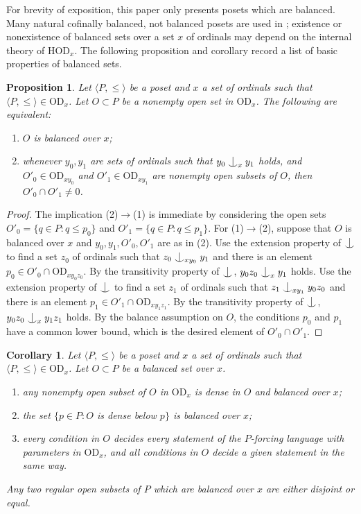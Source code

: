 \documentclass{article}
\newcommand{\hvd}{\mathrm{HOD}}
\newcommand{\vd}{\mathrm{OD}}
\newcommand{\forkindep}[1][]{%
  \mathrel{
    \mathop{
      \vcenter{
        \hbox{\oalign{\noalign{\kern-.3ex}\hfil$\vert$\hfil\cr
              \noalign{\kern-.7ex}
              $\smile$\cr\noalign{\kern-.3ex}}}
      }
    }\displaylimits_{#1}
  }
}
\newtheorem{corollary}[theorem]{Corollary}
\newtheorem{proposition}[theorem]{Proposition}
\theoremstyle{definition}
\begin{document}
\noindent For brevity of exposition, this paper only presents posets which are balanced. Many natural cofinally balanced, not balanced posets are used in \cite{z:geometric}; existence or nonexistence of balanced sets over a set $x$ of ordinals may depend on the internal theory of $\hvd_x$. The following proposition and corollary record a list of basic properties of balanced sets.

\begin{proposition}
\label{extensionproposition1}
Let $\langle P, \leq\rangle$ be a poset and $x$ a set of ordinals such that $\langle P, \leq\rangle\in\vd_x$. Let $O\subset P$ be a nonempty open set in $\vd_x$. The following are equivalent:

\begin{enumerate}
\item $O$ is balanced over $x$;
\item whenever $y_0, y_1$ are sets of ordinals such that $y_0\forkindep[x]y_1$ holds, and $O'_0\in\vd_{xy_0}$ and $O'_1\in\vd_{xy_1}$ are nonempty open subsets of $O$, then $O'_0\cap O'_1\neq 0$.
\end{enumerate}
\end{proposition}

\begin{proof}
The implication (2)$\to$(1) is immediate by considering the open sets $O'_0=\{q\in P\colon q\leq p_0\}$ and $O'_1=\{q\in P\colon q\leq p_1\}$. For (1)$\to$(2), suppose that $O$ is balanced over $x$ and $y_0, y_1, O'_0, O'_1$ are as in (2). Use the extension property of $\forkindep$ to find a set $z_0$ of ordinals such that $z_0\forkindep[xy_0]y_1$ and there is an element $p_0\in O'_0\cap \vd_{xy_0z_0}$. By the transitivity property of $\forkindep$, $y_0z_0\forkindep[x]y_1$ holds. Use the extension property of $\forkindep$ to find a set $z_1$ of ordinals such that $z_1\forkindep[xy_1]y_0z_0$ and there is an element $p_1\in O'_1\cap \vd_{xy_1z_1}$. By the transitivity property of $\forkindep$, $y_0z_0\forkindep[x]y_1z_1$ holds. By the balance assumption on $O$, the conditions $p_0$ and $p_1$ have a common lower bound, which is the desired element of $O'_0\cap O'_1$.
\end{proof}

\begin{corollary}
\label{opencorollary}
Let $\langle P, \leq\rangle$ be a poset and $x$ a set of ordinals such that $\langle P, \leq\rangle\in\vd_x$. Let $O\subset P$ be a balanced set over $x$.

\begin{enumerate}
\item any nonempty open subset of $O$ in $\vd_x$ is dense in $O$ and balanced over $x$;
\item the set $\{p\in P\colon O$ is dense below $p\}$ is balanced over $x$;
\item every condition in $O$ decides every statement of the $P$-forcing language with parameters in $\vd_x$, and all conditions in $O$ decide a given statement in the same way.
\end{enumerate}

\noindent Any two regular open subsets of $P$ which are balanced over $x$ are either disjoint or equal.
\end{corollary}
\end{document}
